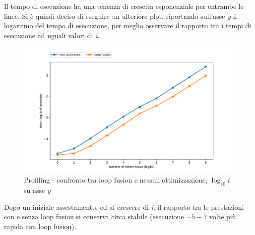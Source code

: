 \documentclass[letterpaper, 11pt]{article}
\begin{document}
\begin{multicols}{2}
  Il tempo di esecuzione ha una tenenza di crescita esponenziale per entrambe le linee. Si è quindi deciso di eseguire un ulteriore plot, riportando sull'asse \textit{y} il logaritmo del tempo di esecuzione, per meglio osservare il rapporto tra i tempi di esecuzione ad uguali valori di \textit{i}.

  \begin{figure}[H]
    \centering
    \includegraphics[width = 1.1 \linewidth]{../LocalOpts/graph_log.png}
    \caption{Profiling - confronto tra loop fusion e nessun'ottimizzazione, $\log_{10}{t}$ su asse \textit{y}}
  \end{figure}

  Dopo un iniziale assestamento, ed al crescere di \textit{i}, il rapporto tra le prestazioni con e senza loop fusion si conserva circa stabile (esecuzione $\sim 5-7$ volte più rapida con loop fusion).

\end{multicols}
\end{document}
